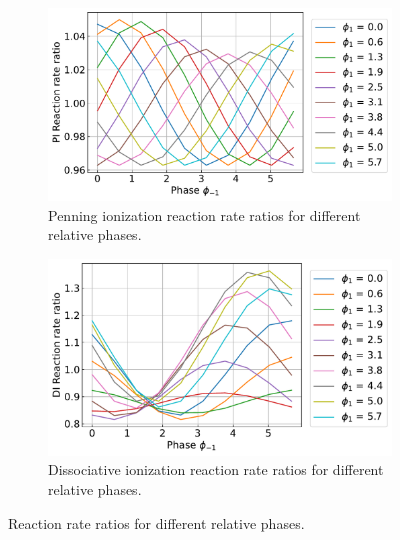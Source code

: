 \documentclass{article}
\begin{document}
    \begin{figure}[H]
        \centering
        \begin{subfigure}{.4\linewidth}
            \centering
            \includegraphics[width=\linewidth]{PI_reaction_ratio_phases.pdf}
            \caption{Penning ionization reaction rate ratios for different relative phases.}
        \end{subfigure}
        \begin{subfigure}{.4\linewidth}
            \centering
            \includegraphics[width=\linewidth]{DI_reaction_ratio_phases.pdf}
            \caption{Dissociative ionization reaction rate ratios for different relative phases.}
        \end{subfigure}     
        \caption{Reaction rate ratios for different relative phases.}
    \end{figure}
\end{document}
